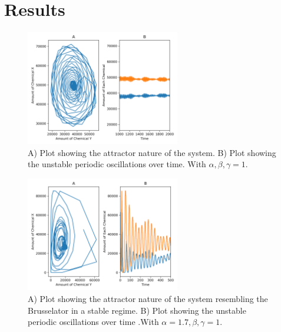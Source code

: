 \documentclass[12pt, A4]{article}
\begin{document}
\section{Results}
\label{sec:Results}

\begin{figure}[b]
  \begin{center}
    \includegraphics[width=0.6\textwidth]{first_pic.png}
  \end{center}
  \caption{A) Plot showing the attractor nature of the system. B) Plot showing the unstable periodic oscillations over time. With $\alpha,\beta,\gamma =1$.}
  \label{fig:first}
\end{figure}

\begin{figure}[b]
  \begin{center}
    \includegraphics[width=0.6\textwidth]{organator.png}
  \end{center}
  \caption{A) Plot showing the attractor nature of the system resembling the Brusselator in a stable regime. B) Plot showing the unstable periodic oscillations over time .With $\alpha=1.7, \beta,\gamma =1$.}
  \label{fig:organatro}
\end{figure}
\end{document}
